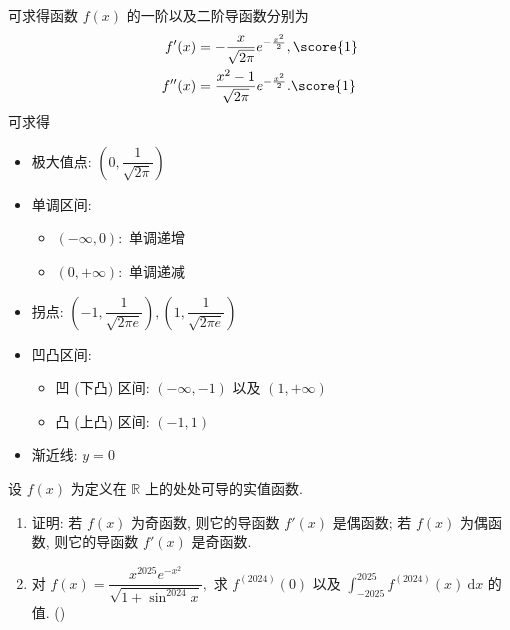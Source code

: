 \begin{solution}
可求得函数 $f(x)$ 的一阶以及二阶导函数分别为
\begin{align*}
f'(x) & = -\dfrac{x}{\sqrt{2\pi}} e^{-\frac{x^2}{2}}, \score{1} \\
f''(x) & = \dfrac{x^2-1}{\sqrt{2\pi}} e^{-\frac{x^2}{2}}. \score{1}
\end{align*}
可求得
\begin{itemize}
\item 极大值点: $\left( 0, \dfrac{1}{\sqrt{2\pi}} \right)$ 
\item 单调区间:
\begin{itemize}
\item $(-\infty, 0):$ 单调递增 
\item $(0, +\infty):$ 单调递减 
\end{itemize}
\item 拐点: $\left( -1, \dfrac{1}{\sqrt{2\pi e}} \right), \left( 1, \dfrac{1}{\sqrt{2\pi e}} \right)$ 
\item 凹凸区间:
\begin{itemize}
\item 凹 (下凸) 区间: $(-\infty, -1)$ 以及 $(1, +\infty)$ 
\item 凸 (上凸) 区间: $(-1, 1)$ 
\end{itemize}
\item 渐近线: $y = 0$ 
\end{itemize}
\end{solution}


\begin{question}[points = 10]
设 $f(x)$ 为定义在 $\mathbb{R}$ 上的处处可导的实值函数.
\begin{enumerate}
\item 证明: 若 $f(x)$ 为奇函数, 则它的导函数 $f'(x)$ 是偶函数; 若 $f(x)$ 为偶函数, 则它的导函数 $f'(x)$ 是奇函数.
\item 对 $\displaystyle f(x) = \dfrac{x^{2025} e^{-x^2}}{\sqrt{1 + \sin^{2024} x}},$ 求 $f^{(2024)}(0)$ 以及 $\displaystyle \int_{-2025}^{2025} f^{(2024)}(x) ~ \mathrm{d} x$ 的值. ()
\end{enumerate}

\end{question}

